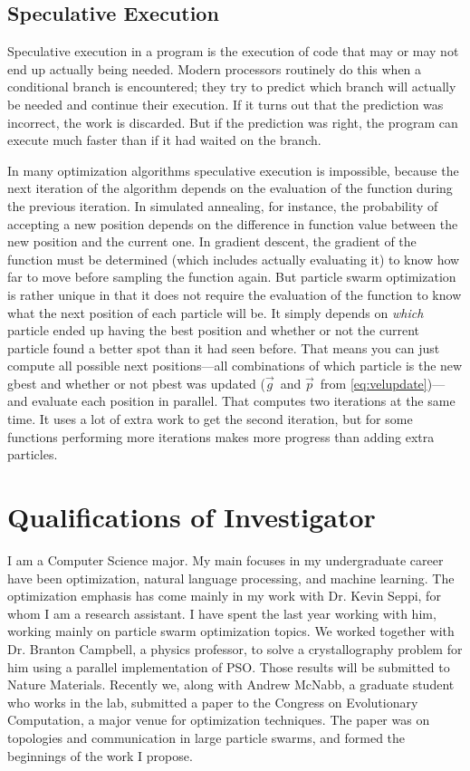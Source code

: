 \documentclass[onecolumn, 12pt]{article}
\providecommand{\gbest}{\ensuremath{\Vec{g}}}
\providecommand{\pbest}{\ensuremath{\Vec{p}}}
\begin{document}
\subsection{Speculative Execution}

Speculative execution in a program is the execution of code that may or may not
end up actually being needed.  Modern processors routinely do this when a
conditional branch is encountered; they try to predict which branch will
actually be needed and continue their execution.  If it turns out that the
prediction was incorrect, the work is discarded.  But if the prediction was
right, the program can execute much faster than if it had waited on the branch.  

In many optimization algorithms speculative execution is impossible, because
the next iteration of the algorithm depends on the evaluation of the function
during the previous iteration.  In simulated annealing, for instance, the
probability of accepting a new position depends on the difference in function
value between the new position and the current one.  In gradient descent, the
gradient of the function must be determined (which includes actually evaluating
it) to know how far to move before sampling the function again.  But particle
swarm optimization is rather unique in that it does not require the evaluation
of the function to know what the next position of each particle will be.  It
simply depends on \emph{which} particle ended up having the best position and
whether or not the current particle found a better spot than it had seen
before.  That means you can just compute all possible next positions---all
combinations of which particle is the new gbest and whether or not pbest was
updated (\gbest\ and \pbest\ from \eqref{eq:velupdate})---and evaluate each
position in parallel.  That computes two iterations at the same time.  It uses
a lot of extra work to get the second iteration, but for some functions
performing more iterations makes more progress than adding extra particles.


\section{Qualifications of Investigator}

I am a Computer Science major.  My main focuses in my undergraduate career have
been optimization, natural language processing, and machine learning.  The
optimization emphasis has come mainly in my work with Dr. Kevin Seppi, for whom
I am a research assistant.  I have spent the last year working with him,
working mainly on particle swarm optimization topics.  We worked together with
Dr. Branton Campbell, a physics professor, to solve a crystallography problem
for him using a parallel implementation of PSO.  Those results will be
submitted to Nature Materials.  Recently we, along with Andrew McNabb, a
graduate student who works in the lab, submitted a paper to the Congress on
Evolutionary Computation, a major venue for optimization techniques.  The paper
was on topologies and communication in large particle swarms, and formed the
beginnings of the work I propose.
\end{document}
